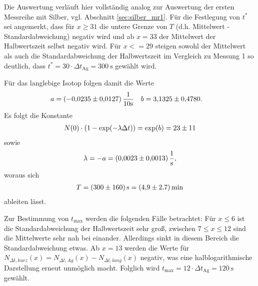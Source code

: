 \noindent
Die Auswertung verläuft hier vollständig analog zur Auswertung der ersten Messreihe mit Silber, vgl. Abschnitt \ref{sec:silber_mr1}.
Für die Festlegung von $t^*$ sei angemerkt, 
dass für $x \geq 31$ die untere Grenze von $T$ (d.h. Mittelwert - Standardabweichung) negativ wird und ab 
$x = 33$ der Mittelwert der Halbwertszeit selbst negativ wird.
Für $ x <= 29$ steigen sowohl der Mittelwert als auch die Standardabweichung der Halbwertszeit im Vergleich zu Messung 1 so deutlich, 
dass $t^* = 30 \cdot \Delta t_\text{Ag} = \qty[]{300}{\second}$ gewählt wird.

\noindent
Für das langlebige Isotop folgen damit die Werte 
\begin{align}
    a &= (\num{-0.0235 +- 0.0127}) \, \frac{1}{10 \unit{\second}}  & b &= \num{3.1325 +- 0.4780}.
\end{align}
Es folgt die Konstante
\begin{align}
    N(0) \cdot \left(1- \exp(- \lambda \Delta t)\right) = \exp(b) = \num[]{23 +- 11}
\end{align}
sowie 
\begin{align}
    \lambda = - a = \qty[]{0.0023 +- 0.0013}{\per\second},
\end{align}
woraus sich 
\begin{align}
    T = \qty[]{300 +- 160}{\second} = \qty[]{4.9 +- 2.7}{\minute}
\end{align}
ableiten lässt.

\noindent
Zur Bestimmung von $t_\text{max}$ werden die folgenden Fälle betrachtet:
Für $x \leq 6$ ist die Standardabweichung der Halbwertszeit sehr groß, zwischen $7 \leq x \leq 12$ sind die Mittelwerte sehr nah bei einander.
Allerdings sinkt in diesem Bereich die Standardabweichung etwas.
Ab $x = 13$ werden die Werte für $N_{\Delta t,kurz}(x) = N_{\Delta t,Ag}(x) - N_{\Delta t,lang}(x)$ negativ,
was eine halblogarithmische Darstellung erneut unmöglich macht.
Folglich wird $t_\text{max} = 12 \cdot \Delta t_\text{Ag} = \qty[]{120}{\second}$ gewählt.

